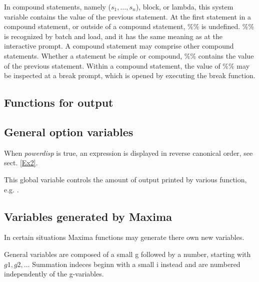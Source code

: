 \documentclass[../Maxima_Workbook.tex]{subfiles}
\begin{document}
\lz In compound statements, namely ($ s_1, \dots, s_n $), block, or lambda, this system variable contains the value of the previous statement. At the first statement in a compound statement, or outside of a compound statement, \%\% is undefined. \%\% is recognized by batch and load, and it has the same meaning as at the interactive prompt. A compound statement may comprise other compound statements. Whether a statement be simple or compound, \%\% contains the value of the previous statement. Within a compound statement, the value of \%\% may be inspected at a break prompt, which is opened by executing the break function.

\subsection{Functions for output}

\lz {} \hfill \tcr{[function]}

 \hfill {}

\subsection{General option variables}

\lz {} \hfill {}

\lz When \emph{powerdisp} is true, an expression is displayed in reverse canonical order, see sect. \ref{Ex2}.

\lz {} \hfill {}

\lz This global variable controls the amount of output printed by various function, e.g. .

\subsection{Variables generated by Maxima}

In certain situations Maxima functions may generate there own new variables. 

\lz General variables are composed of a small g followed by a number, starting with $ g1, g2, \dots $ Summation indeces beginn with a small i instead and are numbered independently of the g-variables.
\end{document}
